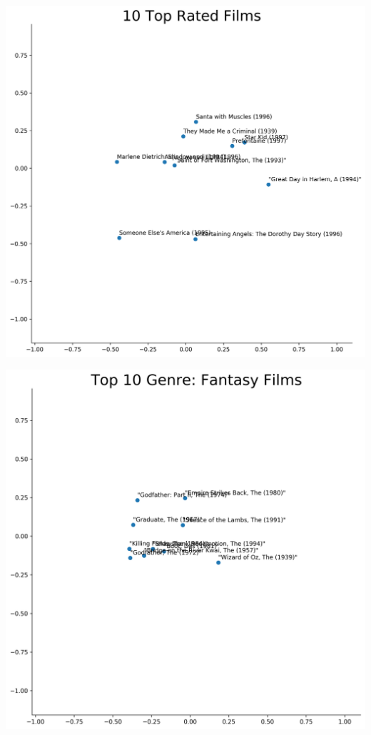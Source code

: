 \begin{appendices}
\begin{center}
\begin{minipage}{0.48\linewidth}
\captionsetup{width=.85\linewidth}
\end{minipage}
\begin{minipage}{0.48\linewidth}
\label{appendix:viz-2}
\includegraphics[scale=0.35]{"10 Top Rated Films"}
\captionsetup{width=.85\linewidth}
\end{minipage}
\hfill %
\begin{minipage}{0.48\linewidth}
\label{appendix:viz-3}
\includegraphics[scale=0.35]{"Top 10 Genre: Fantasy Films"}

\end{minipage}
\end{center}
\end{appendices}
